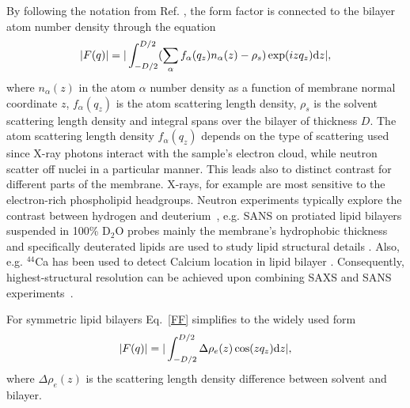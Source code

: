 \documentclass[aps,prl,superscriptaddress,twocolumn]{revtex4}
\begin{document}
By following the notation from Ref. \cite{kucerka10}, the form factor is connected to the bilayer atom number density through the 
equation 
\begin{equation}\label{FF}
|F(q)|=|\int_{-D/2}^{D/2}(\sum_\alpha f_\alpha(q_z)n_\alpha(z) - \rho_s) \exp(i z q_z) {\rm d}z|,
\end{equation}
where $n_\alpha(z)$ in the atom $\alpha$ number density as a function of membrane normal coordinate $z$,
$f_\alpha(q_z)$ is the atom scattering length density,
$\rho_s$ is the solvent scattering length density and integral spans over the bilayer of thickness $D$.
The atom scattering length density $f_\alpha(q_z)$ depends on the type of scattering used since
X-ray photons interact with the sample's electron cloud, while neutron scatter off nuclei in a particular manner.
This leads also to distinct contrast for different parts of the membrane. X-rays, for example are most sensitive to the electron-rich 
phospholipid headgroups. Neutron experiments typically explore the contrast between hydrogen and deuterium~\cite{marquardt15},
e.g. SANS on protiated lipid bilayers suspended in 100\% D$_2$O probes mainly the membrane's hydrophobic thickness
and specifically deuterated lipids are used to study lipid structural details \cite{buldt78,buldt79}.
Also, e.g. $^{44}$Ca has been used to detect Calcium location in lipid bilayer \cite{herbette84}.
Consequently, highest-structural resolution can be achieved upon combining SAXS and SANS experiments~\cite{kucerka05a,kucerka08a}.

For symmetric lipid bilayers Eq.~\ref{FF} simplifies to the widely used form
\begin{equation}\label{FFsimpl}
|F(q)|=|\int_{-D/2}^{D/2}\Delta \rho_e(z) \cos(zq_z) {\rm d}z|,
\end{equation}
where $\Delta \rho_e(z)$ is the scattering length density difference between solvent and bilayer.



\end{document}

